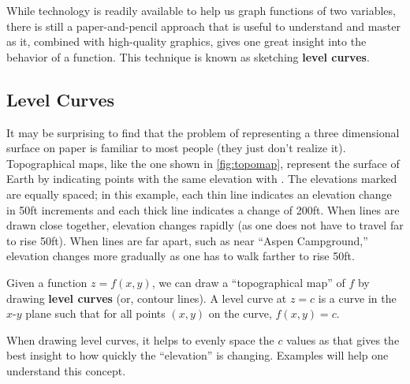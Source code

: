While technology is readily available to help us graph functions of two variables, there is still a paper-and-pencil approach that is useful to understand and master as it, combined with high-quality graphics, gives one great insight into the behavior of a function. This technique is known as sketching \textbf{level curves}.

\subsection{Level Curves}

It may be surprising to find that the problem of representing a three dimensional surface on paper is familiar to most people (they just don't realize it). Topographical maps, like the one shown in \autoref{fig:topomap}, represent the surface of Earth by indicating points with the same elevation with . The elevations marked are equally spaced; in this example, each thin line indicates an elevation change in 50ft increments and each thick line indicates a change of 200ft. When lines are drawn close together, elevation changes rapidly (as one does not have to travel far to rise 50ft). When lines are far apart, such as near ``Aspen Campground,'' elevation changes more gradually as one has to walk farther to rise 50ft.


Given a function $z=f(x,y)$, we can draw a ``topographical map'' of $f$ by drawing \textbf{level curves} (or, contour lines). A level curve at $z=c$ is a curve in the $x$-$y$ plane such that for all points $(x,y)$ on the curve, $f(x,y) = c$. 

When drawing level curves, it helps to evenly space the $c$ values as that gives the best insight to how quickly the ``elevation'' is changing. Examples will help one understand this concept.


